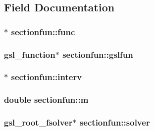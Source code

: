 \subsection{Field Documentation}
\hypertarget{structsectionfun_ad5d55385480a9ee21cfdce5e6eb7fb94}{
\subsubsection[{func}]{$\ast$ {\bf sectionfun::func}}}
\label{structsectionfun_ad5d55385480a9ee21cfdce5e6eb7fb94}
\hypertarget{structsectionfun_a3eea06731198b02e52f5c8914648d28c}{
\subsubsection[{gslfun}]{\setlength{\rightskip}{0pt plus 5cm}gsl\_\-function$\ast$ {\bf sectionfun::gslfun}}}
\label{structsectionfun_a3eea06731198b02e52f5c8914648d28c}
\hypertarget{structsectionfun_ae67f890cbfcb7e8bd9ed1228982ae5e5}{
\subsubsection[{interv}]{$\ast$ {\bf sectionfun::interv}}}
\label{structsectionfun_ae67f890cbfcb7e8bd9ed1228982ae5e5}
\hypertarget{structsectionfun_a657c484c3b691ba3d76d582a972a8178}{
\subsubsection[{m}]{\setlength{\rightskip}{0pt plus 5cm}double {\bf sectionfun::m}}}
\label{structsectionfun_a657c484c3b691ba3d76d582a972a8178}
\hypertarget{structsectionfun_a334da4ba5527ca09176f76cc35f63891}{
\subsubsection[{solver}]{\setlength{\rightskip}{0pt plus 5cm}gsl\_\-root\_\-fsolver$\ast$ {\bf sectionfun::solver}}}
\label{structsectionfun_a334da4ba5527ca09176f76cc35f63891}
